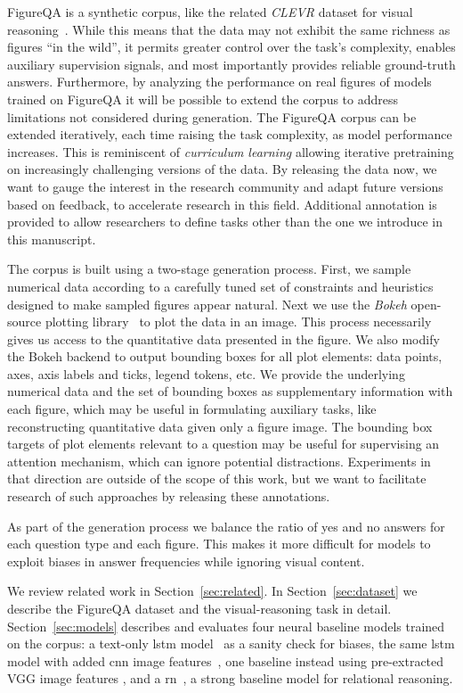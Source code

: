 \documentclass{article} %
\begin{document}
FigureQA is a synthetic corpus, like the related \emph{CLEVR} dataset for visual reasoning~\citep{johnson2016clevr}.
While this means that the data may not exhibit the same richness as figures ``in the wild'',  it permits greater control over the task's complexity, enables auxiliary supervision signals, and most importantly provides reliable ground-truth answers. Furthermore, by analyzing the performance on real figures of models trained on FigureQA it will be possible to extend the corpus to address limitations not considered during generation.
The FigureQA corpus can be extended iteratively, each time raising the task complexity, as model performance increases. This is reminiscent of \emph{curriculum learning} \citep{bengio2009curriculum} allowing iterative pretraining on increasingly challenging versions of the data. By releasing the data now, we want to gauge the interest in the research community and adapt future versions based on feedback, to accelerate research in this field.
Additional annotation is provided to allow researchers to define tasks other than the one we introduce in this manuscript.

The corpus is built using a two-stage generation process. First, we sample numerical data according to a carefully tuned set of constraints and heuristics designed to make sampled figures appear natural.
Next we use the \emph{Bokeh} open-source plotting library~\citep{bokeh} to plot the data in an image. This process necessarily gives us access to the quantitative data presented in the figure. We also modify the Bokeh backend to output bounding boxes for all plot elements: data points, axes, axis labels and ticks, legend tokens, etc. We provide the underlying numerical data and the set of bounding boxes as supplementary information with each figure, which may be useful in formulating auxiliary tasks, like reconstructing quantitative data given only a figure image. The bounding box targets of plot elements relevant to a question may be useful for supervising an attention mechanism, which can ignore potential distractions. Experiments in that direction are outside of the scope of this work, but we want to facilitate research of such approaches by releasing these annotations.

As part of the generation process we balance the ratio of yes and no answers for each question type and each figure. 
This makes it more difficult for models to exploit biases in answer frequencies while ignoring visual content.

We review related work in Section~\ref{sec:related}.
In Section~\ref{sec:dataset} we describe the FigureQA dataset and the visual-reasoning task in detail. Section~\ref{sec:models} describes and evaluates four neural baseline models trained on the corpus: a text-only \gls{lstm} model~\citep{hochreiter1997long} as a sanity check for biases, the same \gls{lstm} model with added \gls{cnn} image features~\citep{lecun1998gradient,fukushima1988neocognitron}, one baseline instead using pre-extracted VGG image features \citep{simonyan2014very}, and a \gls{rn}~\citep{santoro2017simple}, a strong baseline model for relational reasoning. 
\end{document}
